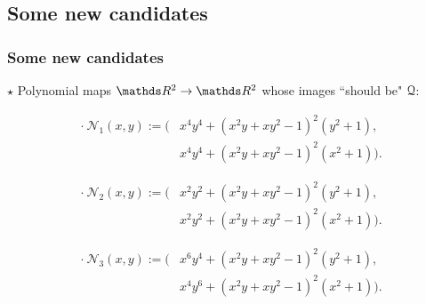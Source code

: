 \documentclass{beamer}
\begin{document}
\subsection{Some new candidates}
\begin{frame}
\frametitle{Some new candidates}
$\star$ Polynomial maps $\R^2\to\R^2$ whose images ``should be" $\mathcal{Q}$:

\begin{align*}
\cdot\ \mathcal{N}_1(x,y):=\big(&x^4y^4+(x^2y+xy^2-1)^2(y^2+1),\\
&x^4y^4+(x^2y+xy^2-1)^2(x^2+1)\big).
\end{align*}

\begin{align*}
\cdot\ \mathcal{N}_2(x,y):=\big(&x^2y^2+(x^2y+xy^2-1)^2(y^2+1),\\
&x^2y^2+(x^2y+xy^2-1)^2(x^2+1)\big).
\end{align*}

\begin{align*}
\cdot\ \mathcal{N}_3(x,y):=\big(&x^6y^4+(x^2y+xy^2-1)^2(y^2+1),\\
&x^4y^6+(x^2y+xy^2-1)^2(x^2+1)\big).
\end{align*}

\end{frame}
\end{document}
